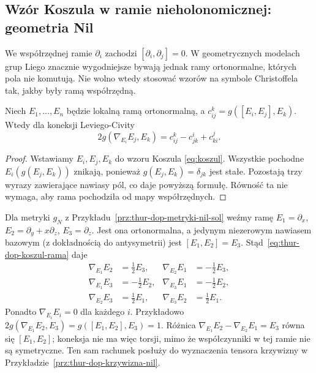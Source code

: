 \subsection*{Wzór Koszula w ramie nieholonomicznej: geometria Nil}
\label{sec:thur-dop-koszul-rama}
We współrzędnej ramie $\partial_i$ zachodzi $[\partial_i,\partial_j]=0$.
W geometrycznych modelach grup Liego znacznie wygodniejsze bywają jednak
ramy ortonormalne, których pola nie komutują. Nie wolno wtedy stosować
wzorów na symbole Christoffela tak, jakby były ramą współrzędną.

\begin{stwierdzenie}
\label{prop:thur-dop-koszul-rama}
Niech $E_1,\ldots,E_n$ będzie lokalną ramą ortonormalną,
a $c_{ij}^{k}=g([E_i,E_j],E_k)$. Wtedy dla koneksji Leviego-Civity
\begin{equation}\label{eq:thur-dop-koszul-rama}
2g(\nabla_{E_i}E_j,E_k)
=c_{ij}^{k}-c_{jk}^{i}+c_{ki}^{j}.
\end{equation}
\end{stwierdzenie}
\begin{proof}
Wstawiamy $E_i,E_j,E_k$ do wzoru Koszula
\eqref{eq:koszul}. Wszystkie pochodne $E_i(g(E_j,E_k))$
znikają, ponieważ $g(E_j,E_k)=\delta_{jk}$ jest stałe.
Pozostają trzy wyrazy zawierające nawiasy pól,
co daje powyższą formułę. Równość ta nie wymaga,
aby rama pochodziła od mapy współrzędnych.
\end{proof}

\begin{przyklad}
\label{prz:thur-dop-koneksja-nil}
Dla metryki $g_N$ z Przykładu~\ref{prz:thur-dop-metryki-nil-sol}
weźmy ramę
$E_1=\partial_x$, $E_2=\partial_y+x\partial_z$,
$E_3=\partial_z$. Jest ona ortonormalna, a jedynym
niezerowym nawiasem bazowym (z dokładnością do antysymetrii)
jest $[E_1,E_2]=E_3$. Stąd~\eqref{eq:thur-dop-koszul-rama}
daje
\[
\begin{aligned}
 \nabla_{E_1}E_2&=\tfrac12E_3,&
 \nabla_{E_2}E_1&=-\tfrac12E_3,\\
 \nabla_{E_1}E_3&=-\tfrac12E_2,&
 \nabla_{E_3}E_1&=-\tfrac12E_2,\\
 \nabla_{E_2}E_3&=\tfrac12E_1,&
 \nabla_{E_3}E_2&=\tfrac12E_1.
\end{aligned}
\]
Ponadto $\nabla_{E_i}E_i=0$ dla każdego $i$.
Przykładowo $2g(\nabla_{E_1}E_2,E_3)
=g([E_1,E_2],E_3)=1$.
Różnica $\nabla_{E_1}E_2-\nabla_{E_2}E_1=E_3$
równa się $[E_1,E_2]$; koneksja nie ma więc torsji,
mimo że współczynniki w tej ramie nie są symetryczne.
Ten sam rachunek posłuży do wyznaczenia tensora krzywizny
w Przykładzie~\ref{prz:thur-dop-krzywizna-nil}.
\end{przyklad}
